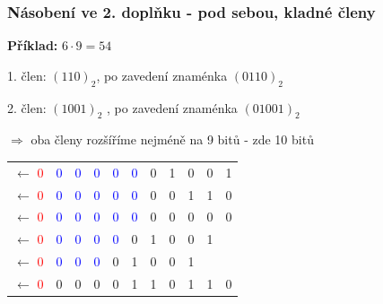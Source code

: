   \begin{frame}
    \frametitle{Násobení ve 2. doplňku - pod sebou, kladné členy}
    \boldmath
    
    \textbf{Příklad:} $6\cdot 9 = 54$
    
      \vspace{3mm}
      1. člen: $(110)_{2}$, po zavedení znaménka $(0110)_{2}$
      
      2. člen: $(1001)_{2}$ , po zavedení znaménka $(01001)_{2}$
      
      $\Rightarrow$ oba členy rozšíříme nejméně na 9 bitů - zde 10 bitů
      \vspace{10mm}
      \begin{center}
        \begin{tabular}{c | c c c c c c c c c c}
          $\longleftarrow$ \textcolor{red}{0} & \textcolor{blue}{0} & \textcolor{blue}{0} & \textcolor{blue}{0} & \textcolor{blue}{0} & \textcolor{blue}{0} & 0 & 1 & 0 & 0 & 1 \\
          $\longleftarrow$ \textcolor{red}{0} & \textcolor{blue}{0} & \textcolor{blue}{0} & \textcolor{blue}{0} & \textcolor{blue}{0} & \textcolor{blue}{0} & 0 & 0 & 1 & 1 & 0 \\
          \hline
          $\longleftarrow$ \textcolor{red}{0} & \textcolor{blue}{0} & \textcolor{blue}{0} & \textcolor{blue}{0} & \textcolor{blue}{0} & \textcolor{blue}{0} & 0 & 0 & 0 & 0 & 0 \\
          $\longleftarrow$ \textcolor{red}{0} & \textcolor{blue}{0} & \textcolor{blue}{0} & \textcolor{blue}{0} & \textcolor{blue}{0} & 0 & 1 & 0 & 0 & 1 &  \\
          $\longleftarrow$ \textcolor{red}{0} & \textcolor{blue}{0} & \textcolor{blue}{0} & \textcolor{blue}{0} & 0 & 1 & 0 & 0 & 1 &  &  \\
          \hline
          $\longleftarrow$ \textcolor{red}{0} & 0 & 0 & 0 & 0 & 1 & 1 & 0 & 1 & 1 & 0
        \end{tabular}
      \end{center}
    
	\end{frame}


